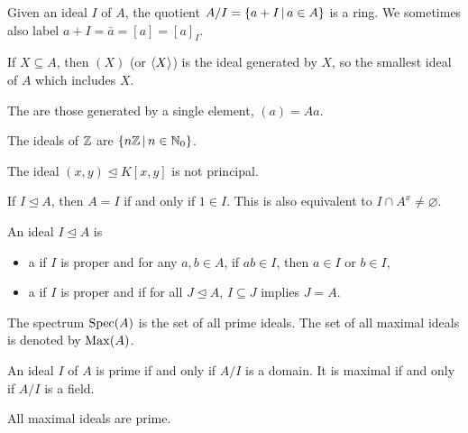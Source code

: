 \begin{remark}
  Given an ideal $I$ of $A$, the quotient $A/I = \{ a + I \,|\, a \in A \}$ is a
  ring.
  We sometimes also label $a + I = \bar{a} = [a] = [a]_I$.
\end{remark}

\begin{definition}
  If $X \subseteq A$, then $(X)$ (or $\left< X \right>$) is the ideal generated by $X$, so
  the smallest ideal of $A$ which includes $X$.
\end{definition}

\begin{definition}
  The  are those generated by a single element, $(a) =
  Aa$.
\end{definition}

\begin{example}
  The ideals of $\mathbb{Z}$ are $\{n \mathbb{Z} \,|\, n \in \mathbb{N}_0 \}$.
\end{example}

\begin{example}
  The ideal $(x,y) \trianglelefteq K[x,y]$ is not principal.
\end{example}

\begin{remark}
  If $I \trianglelefteq A$, then $A = I$ if and only if $1 \in I$.
  This is also equivalent to $I \cap A^x \ne \varnothing$.
\end{remark}

\begin{definition}
  An ideal $I \trianglelefteq A$ is
  \begin{itemize}
  \item a  if $I$ is proper and for any $a, b \in A$, if $ab
	\in I$, then $a \in I$ or $b \in I$,
  \item a  if $I$ is proper and if for all $J
	\trianglelefteq A$, $I \subseteq J$ implies $J = A$.
  \end{itemize}
  The spectrum $\operatorname{Spec}(A)$ is the set of all prime ideals.
  The set of all maximal ideals is denoted by $\operatorname{Max}(A)$.
\end{definition}

\begin{theorem}
  An ideal $I$ of $A$ is prime if and only if $A/I$ is a domain.
  It is maximal if and only if $A/I$ is a field.
\end{theorem}

\begin{corollary}
  All maximal ideals are prime.
\end{corollary}

